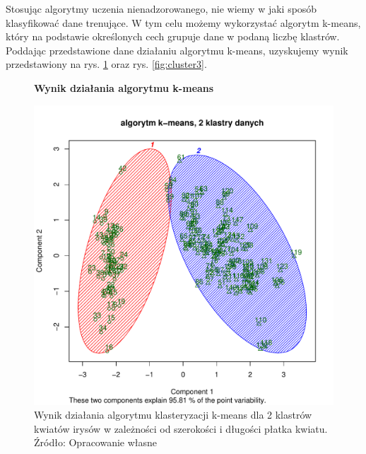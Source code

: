 Stosując algorytmy uczenia nienadzorowanego, nie wiemy w jaki sposób klasyfikować dane trenujące. W tym celu możemy 
wykorzystać algorytm k-means\cite{coates2012learning}, który na podstawie określonych cech grupuje dane w podaną liczbę 
klastrów.
Poddając przedstawione dane działaniu algorytmu k-means, uzyskujemy wynik przedstawiony na rys. \ref{fig:cluster2} oraz 
rys. \ref{fig:cluster3}.


\begin{figure}[h!]
    \centering
    \textbf{Wynik działania algorytmu k-means}\par\medskip
    \includegraphics[scale=0.5]{cluster2}
    \caption{Wynik działania algorytmu klasteryzacji k-means dla 2 klastrów kwiatów irysów w zależności od szerokości i 
długości płatka kwiatu. Źródło: Opracowanie własne}
    \label{fig:cluster2}
\end{figure}

